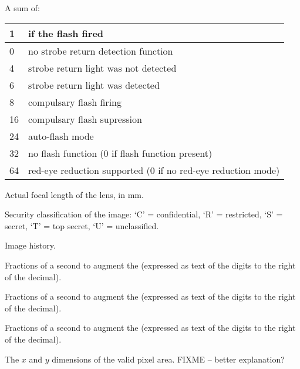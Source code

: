A sum of:
\smallskip

\begin{tabular}{p{0.3in} p{4in}}
1 & if the flash fired \\
\hline
0 & no strobe return detection function \\
4 & strobe return light was not detected \\
6 & strobe return light was detected \\
\hline
8 & compulsary flash firing \\
16 & compulsary flash supression \\
24 & auto-flash mode \\
\hline 
32 & no flash function (0 if flash function present) \\
\hline
64 & red-eye reduction supported (0 if no red-eye reduction mode) 
\end{tabular}

\apiend

Actual focal length of the lens, in mm.
\apiend

Security classification of the image: `C' = confidential,
`R' = restricted, `S' = secret, `T' = top secret,
`U' = unclassified.
\apiend

Image history.
\apiend



Fractions of a second to augment the  (expressed
as text of the digits to the right of the decimal).
\apiend

Fractions of a second to augment the  (expressed
as text of the digits to the right of the decimal).
\apiend

Fractions of a second to augment the  (expressed
as text of the digits to the right of the decimal).
\apiend


The $x$ and $y$ dimensions of the valid pixel area.
FIXME -- better explanation?
\apiend

